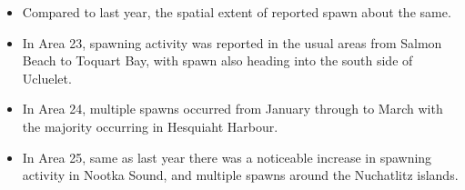 \begin{itemize}
\item Compared to last year, the spatial extent of reported spawn about the same.
\item In Area 23, spawning activity was reported in the usual areas from Salmon Beach to Toquart Bay, with spawn also heading into the south side of Ucluelet.
\item In Area 24, multiple spawns occurred from January through to March with the majority occurring in Hesquiaht Harbour.
\item In Area 25, same as last year there was a noticeable increase in spawning activity in Nootka Sound, and multiple spawns around the Nuchatlitz islands.
\end{itemize}